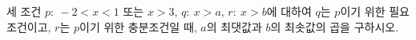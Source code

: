 세 조건 $p:\ -2<x<1$ 또는 $x>3$, $q:\ x>a$, $r:\ x>b$에 대하여 $q$는 $p$이기 위한 필요조건이고, $r$는 $p$이기 위한 충분조건일 때, $a$의 최댓값과 $b$의 최솟값의 곱을 구하시오. 
